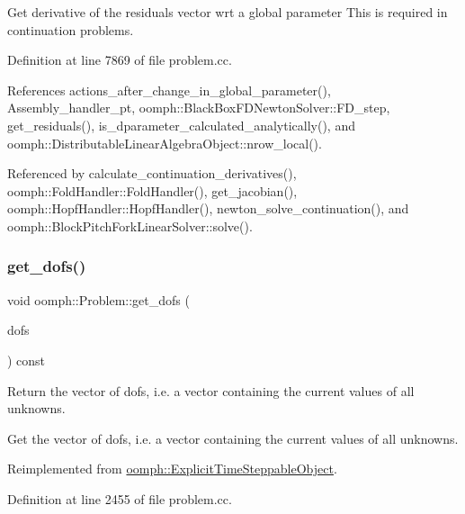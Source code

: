 Get derivative of the residuals vector wrt a global parameter This is required in continuation problems. 

Definition at line 7869 of file problem.\+cc.



References actions\+\_\+after\+\_\+change\+\_\+in\+\_\+global\+\_\+parameter(), Assembly\+\_\+handler\+\_\+pt, oomph\+::\+Black\+Box\+F\+D\+Newton\+Solver\+::\+F\+D\+\_\+step, get\+\_\+residuals(), is\+\_\+dparameter\+\_\+calculated\+\_\+analytically(), and oomph\+::\+Distributable\+Linear\+Algebra\+Object\+::nrow\+\_\+local().



Referenced by calculate\+\_\+continuation\+\_\+derivatives(), oomph\+::\+Fold\+Handler\+::\+Fold\+Handler(), get\+\_\+jacobian(), oomph\+::\+Hopf\+Handler\+::\+Hopf\+Handler(), newton\+\_\+solve\+\_\+continuation(), and oomph\+::\+Block\+Pitch\+Fork\+Linear\+Solver\+::solve().

\mbox{\label{classoomph_1_1Problem_ae2ef66732d76053dba15001818c0605c}} 
\subsubsection{\texorpdfstring{get\+\_\+dofs()}{get\_dofs()}\hspace{0.1cm}{\footnotesize\ttfamily [1/2]}}
{\footnotesize\ttfamily void oomph\+::\+Problem\+::get\+\_\+dofs (\begin{DoxyParamCaption}\item[{\hyperlink{classoomph_1_1DoubleVector}{Double\+Vector} \&}]{dofs }\end{DoxyParamCaption}) const\hspace{0.3cm}{\ttfamily [virtual]}}



Return the vector of dofs, i.\+e. a vector containing the current values of all unknowns. 

Get the vector of dofs, i.\+e. a vector containing the current values of all unknowns. 

Reimplemented from \hyperlink{classoomph_1_1ExplicitTimeSteppableObject_a0fcf43487590dd723f25184067f26219}{oomph\+::\+Explicit\+Time\+Steppable\+Object}.



Definition at line 2455 of file problem.\+cc.



